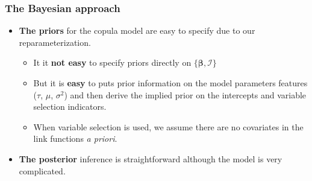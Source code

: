 \documentclass[10pt,aspectratio=43]{beamer}
\begin{document}
\begin{frame}
  \frametitle{The Bayesian approach}
  \begin{itemize}

  \item \textbf{The priors} for the copula model are easy to specify due to our
    reparameterization.

    \begin{itemize}

    \item It it \textbf{not easy} to specify priors directly on
      $\{\bm{\beta},\bm{\mathcal{I}}\}$

    \item But it is \textbf{easy} to puts prior information on the model parameters
      features ($\tau$, $\mu$, $\sigma^2$) and then derive the implied prior on the
      intercepts and variable selection indicators.

    \item When variable selection is used, we assume there are no covariates in
      the link functions \emph{a priori}.

    \end{itemize}

  \item \textbf{The posterior} inference is straightforward although the model is very
    complicated.
  \end{itemize}
\end{frame}
\end{document}
